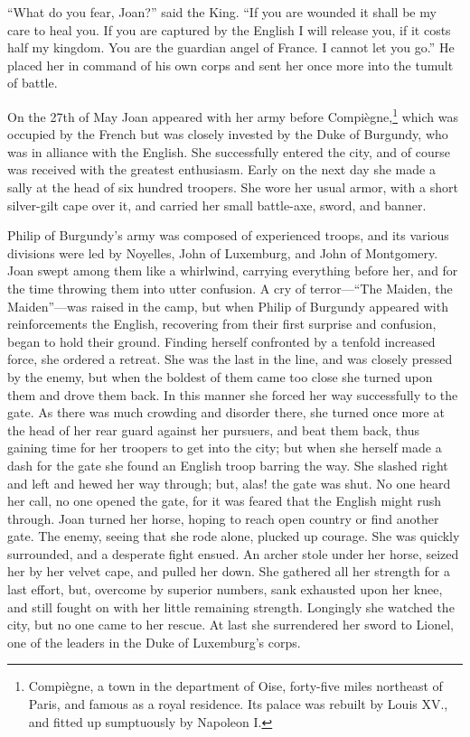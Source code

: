 ``What do you fear, Joan?'' said the King. ``If you are wounded it shall
be my care to heal you. If you are captured by the English I will
release you, if it costs half my kingdom. You are the guardian angel of
France. I cannot let you go.'' He placed her in command of his own corps
and sent her once more into the tumult of battle.

On the 27th of May Joan appeared with her army before
Compiègne,\footnote{Compiègne, a town in the department of Oise,
  forty-five miles northeast of Paris, and famous as a royal residence.
  Its palace was rebuilt by Louis XV., and fitted up sumptuously by
  Napoleon I.} which was occupied by the French but was closely invested
by the Duke of Burgundy, who was in alliance with the English. She
successfully entered the city, and of course was received with the
greatest enthusiasm. Early on the next day she made a sally at the head
of six hundred troopers. She wore her usual armor, with a short
silver-gilt cape over it, and carried her small battle-axe, sword, and
banner.

Philip of Burgundy's army was composed of experienced troops, and its
various divisions were led by Noyelles, John of Luxemburg, and John of
Montgomery. Joan swept among them like a whirlwind, carrying everything
before her, and for the time throwing them into utter confusion. A cry
of terror---``The Maiden, the Maiden''---was raised in the camp, but
when Philip of Burgundy appeared with reinforcements the English,
recovering from their first surprise and confusion, began to hold their
ground. Finding herself confronted by a tenfold increased force, she
ordered a retreat. She was the last in the line, and was closely pressed
by the enemy, but when the boldest of them came too close she turned
upon them and drove them back. In this manner she forced her way
successfully to the gate. As there was much crowding and disorder there,
she turned once more at the head of her rear guard against her pursuers,
and beat them back, thus gaining time for her troopers to get into the
city; but when she herself made a dash for the gate she found an English
troop barring the way. She slashed right and left and hewed her way
through; but, alas! the gate was shut. No one heard her call, no one
opened the gate, for it was feared that the English might rush through.
Joan turned her horse, hoping to reach open country or find another
gate. The enemy, seeing that she rode alone, plucked up courage. She was
quickly surrounded, and a desperate fight ensued. An archer stole under
her horse, seized her by her velvet cape, and pulled her down. She
gathered all her strength for a last effort, but, overcome by superior
numbers, sank exhausted upon her knee, and still fought on with her
little remaining strength. Longingly she watched the city, but no one
came to her rescue. At last she surrendered her sword to Lionel, one of
the leaders in the Duke of Luxemburg's corps.


